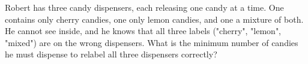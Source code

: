 Robert has three candy dispensers, each releasing one candy at a time. One contains only cherry candies, one only lemon candies, and one a mixture of both. He cannot see inside, and he knows that all three labels ("cherry", "lemon", "mixed") are on the wrong dispensers. What is the minimum number of candies he must dispense to relabel all three dispensers correctly?
